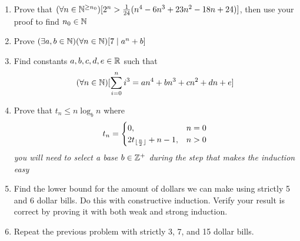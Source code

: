 \documentclass[main.tex]{subfiles}
\begin{document}
\begin{enumerate}
	\item Prove that \((\forall n \in \mathbb{N}^{\geq n_0})[2^n > \frac{1}{24}(n^4 - 6n^3 + 23n^2 - 18n + 24)]\), then use your proof to find \(n_0 \in \mathbb{N}\)
	\item Prove \((\exists a,b \in \mathbb{N})(\forall n \in \mathbb{N})[7 \mid a^n + b]\)
	\item Find constants \(a,b,c,d,e \in \mathbb{R}\) such that \[(\forall n \in \mathbb{N})[\sum_{i=0}^{n} i^3 = an^4 + bn^3 + cn^2 + dn + e]\]
	\item Prove that \(t_n \leq n \log_b n\) where \[t_n = \begin{cases} 0, & n = 0 \\ 2t_{\lfloor\frac{n}{2}\rfloor} + n - 1, & n > 0 \end{cases}\] \textit{you will need to select a base \(b \in \mathbb{Z}^+\) during the step that makes the induction easy}
	\item Find the lower bound for the amount of dollars we can make using strictly 5 and 6 dollar bills. Do this with constructive induction. Verify your result is correct by proving it with both weak and strong induction. %
	\item Repeat the previous problem with strictly 3, 7, and 15 dollar bills.
\end{enumerate}

%
\end{document}
